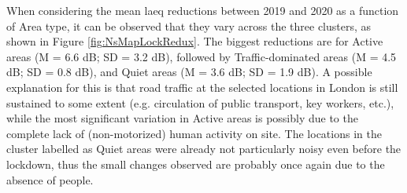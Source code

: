 When considering the mean \gls{laeq} reductions between 2019 and 2020 as a function of Area type, it can be observed that they vary across the three clusters, as shown in Figure \cref{fig:NsMapLockRedux}. The biggest reductions are for Active areas (M = 6.6 dB; SD = 3.2 dB), followed by Traffic-dominated areas (M = 4.5 dB; SD = 0.8 dB), and Quiet areas (M = 3.6 dB; SD = 1.9 dB). A possible explanation for this is that road traffic at the selected locations in London is still sustained to some extent (e.g. circulation of public transport, key workers, etc.), while the most significant variation in Active areas is possibly due to the complete lack of (non-motorized) human activity on site. The locations in the cluster labelled as Quiet areas were already not particularly noisy even before the lockdown, thus the small changes observed are probably once again due to the absence of people.


\begin{table}[h]
\centering
\caption{Reproduced with permission from \citet{Aletta2020Assessing}. Sharpness distributions at the 11 London locations before and during the lockdown measures implementation.}
\label{fig:NsMapLockS}
\end{table}

